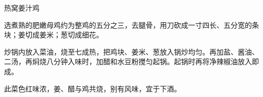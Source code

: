 \begin{recipe}{热窝姜汁鸡}

\ingredients


\preparation

\step 选煮熟的肥嫩母鸡约为整鸡的五分之三，去腿骨，用刀砍成一寸四长、五分宽的条
块；姜切成姜米；葱切成细花。

\step 炒锅内放入菜油，烧至七成热，把鸡块、姜米、葱放入锅炒均匀。再加盐、酱油、
二汤，再焖烧八分钟入味时，加醋和水豆粉搅匀起锅。起锅时再将净辣椒油放入即成。

\features

此菜色红味浓，姜、醋与鸡共烧，别有风味，宜于下酒。

\end{recipe}

